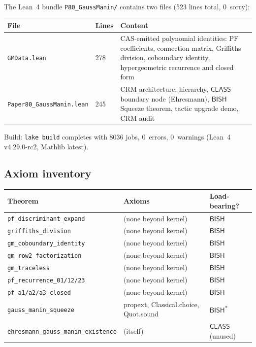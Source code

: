 \documentclass[11pt]{article}
\theoremstyle{plain}
\theoremstyle{definition}
\theoremstyle{remark}
\newcommand{\BISH}{\mathsf{BISH}}
\newcommand{\CLASS}{\mathsf{CLASS}}
\begin{document}
The Lean~4 bundle \texttt{P80\_GaussManin/} contains two files
(523 lines total, 0~sorry):

\begin{center}
\begin{tabular}{llp{7.5cm}}
\toprule
\textbf{File} & \textbf{Lines} & \textbf{Content} \\
\midrule
\texttt{GMData.lean} & 278 & CAS-emitted polynomial identities:
  PF coefficients, connection matrix, Griffiths division, coboundary
  identity, hypergeometric recurrence and closed form \\
\texttt{Paper80\_GaussManin.lean} & 245 & CRM architecture:
  hierarchy, $\CLASS$ boundary node (Ehresmann), $\BISH$ Squeeze
  theorem, tactic upgrade demo, CRM audit \\
\bottomrule
\end{tabular}
\end{center}

Build: \texttt{lake build} completes with 8036 jobs, 0~errors, 0~warnings
(Lean~4 v4.29.0-rc2, Mathlib latest).

\subsection{Axiom inventory}

\begin{center}
\begin{tabular}{lll}
\toprule
\textbf{Theorem} & \textbf{Axioms} & \textbf{Load-bearing?} \\
\midrule
\texttt{pf\_discriminant\_expand} & (none beyond kernel) & $\BISH$ \\
\texttt{griffiths\_division} & (none beyond kernel) & $\BISH$ \\
\texttt{gm\_coboundary\_identity} & (none beyond kernel) & $\BISH$ \\
\texttt{gm\_row2\_factorization} & (none beyond kernel) & $\BISH$ \\
\texttt{gm\_traceless} & (none beyond kernel) & $\BISH$ \\
\texttt{pf\_recurrence\_01/12/23} & (none beyond kernel) & $\BISH$ \\
\texttt{pf\_a1/a2/a3\_closed} & (none beyond kernel) & $\BISH$ \\
\texttt{gauss\_manin\_squeeze} & propext, Classical.choice, Quot.sound & $\BISH$\textsuperscript{*} \\
\texttt{ehresmann\_gauss\_manin\_existence} & (itself) & $\CLASS$ (unused) \\
\bottomrule
\end{tabular}
\end{center}
\end{document}
